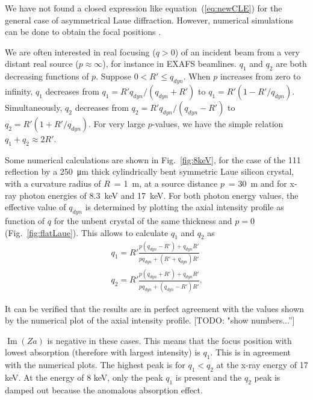 \documentclass[preprint]{iucr}              %
\newcommand{\todo}[1]{{\color{red}[TODO: "#1'']}}
\begin{document}
We have not found a closed expression like equation~(\ref{eq:newCLE}) for the general case of asymmetrical Laue diffraction. However, numerical simulations can be done to obtain the focal positions \cite{GuigayFerrero2016, Nesterets}.

We are often interested in real focusing ($q>0$) of an incident beam from a very distant real source ($p\approx \infty$), for instance in EXAFS beamlines. $q_1$ and $q_2$ are both decreasing functions of $p$. Suppose $0<R'\le q_{dyn}$. When $p$ increases from zero to infinity, $q_1$ decreases from $q_1=R'q_{dyn}/(q_{dyn}+R')$ to $q_1=R'(1-R'/q_{dyn})$. Simultaneously, $q_2$ decreases from $q_2=R'q_{dyn}/(q_{dyn}-R')$ to $q_2=R'(1+R'/q_{dyn})$. For very large $p$-values, we have the simple relation $q_1+q_2\approx 2R'$.

Some numerical calculations are shown in Fig.~\ref{fig:8keV}, for the case of the 111 reflection by a \SI{250}{\micro\meter} thick cylindrically bent symmetric Laue silicon crystal, with a curvature radius of $R$~= \SI{1}{\meter}, at a source distance $p$~= \SI{30}{\meter} and for x-ray photon energies of 8.3~keV and 17~keV. 
For both photon energy values, the effective value of $q_{dyn}$ is determined by plotting the axial intensity profile as function of $q$ for the unbent crystal of the same thickness and $p=0$ (Fig.~\ref{fig:flatLaue}). This allows to calculate $q_1$ and $q_2$ as
\begin{multline}
\label{eq:q1andq2}
q_1 = R' \frac{p(q_{dyn}-R')+q_{dyn}R'}{p q_{dyn}+(R'+q_{dyn})R'} \\
q_2 = R' \frac{p(q_{dyn}+R')+q_{dyn}R'}{p q_{dyn}+(q_{dyn}-R')R'}.
\end{multline}

It can be verified that the results are in perfect agreement with the values shown by the numerical plot of the axial intensity profile. \todo{show numbers...}
 
$\operatorname{Im}(Za)$ is negative in these cases. This means that the focus position with lowest absorption (therefore with largest intensity) is $q_1$. This is in agreement with the numerical plots. 
The highest peak is for $q_1<q_2$ at the x-ray energy of 17 keV. At the energy of 8 keV, only the  peak $q_1$ is present and the $q_2$ peak is damped out because the anomalous absorption effect.
\end{document}
